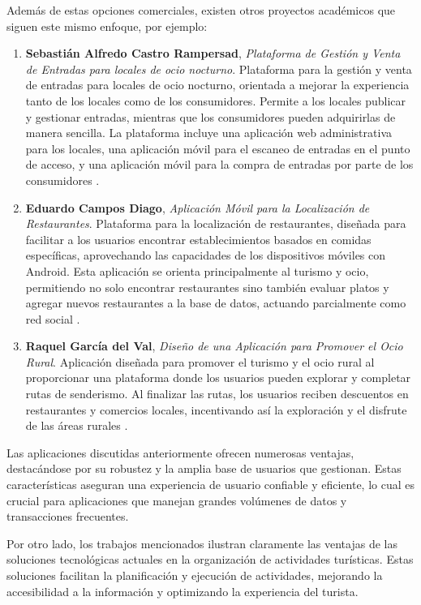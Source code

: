 Además de estas opciones comerciales, existen otros proyectos académicos que siguen este mismo enfoque, por ejemplo:

\begin{enumerate}
    \item \textbf{Sebastián Alfredo Castro Rampersad}, \textit{Plataforma de Gestión y Venta de Entradas
              para locales de ocio nocturno}. Plataforma para la gestión y venta de entradas para locales de ocio nocturno, orientada a mejorar la experiencia tanto de los locales como de los consumidores. Permite a los locales publicar y gestionar entradas, mientras que los consumidores pueden adquirirlas de manera sencilla. La plataforma incluye una aplicación web administrativa para los locales, una aplicación móvil para el escaneo de entradas en el punto de acceso, y una aplicación móvil para la compra de entradas por parte de los consumidores \cite{Sebastian}.
    \item \textbf{Eduardo Campos Diago}, \textit{Aplicación Móvil para la Localización de Restaurantes}. Plataforma para la localización de restaurantes, diseñada para facilitar a los usuarios encontrar establecimientos basados en comidas específicas, aprovechando las capacidades de los dispositivos móviles con Android. Esta aplicación se orienta principalmente al turismo y ocio, permitiendo no solo encontrar restaurantes sino también evaluar platos y agregar nuevos restaurantes a la base de datos, actuando parcialmente como red social \cite{Campos}.
    \item \textbf{Raquel García del Val}, \textit{ Diseño de una Aplicación para Promover el Ocio Rural}. Aplicación diseñada para promover el turismo y el ocio rural al proporcionar una plataforma donde los usuarios pueden explorar y completar rutas de senderismo. Al finalizar las rutas, los usuarios reciben descuentos en restaurantes y comercios locales, incentivando así la exploración y el disfrute de las áreas rurales \cite{Garcia}.
\end{enumerate}

Las aplicaciones discutidas anteriormente ofrecen numerosas ventajas, destacándose por su robustez y la amplia base de usuarios que gestionan. Estas características aseguran una experiencia de usuario confiable y eficiente, lo cual es crucial para aplicaciones que manejan grandes volúmenes de datos y transacciones frecuentes.

Por otro lado, los trabajos mencionados ilustran claramente las ventajas de las soluciones tecnológicas actuales en la organización de actividades turísticas. Estas soluciones facilitan la planificación y ejecución de actividades, mejorando la accesibilidad a la información y optimizando la experiencia del turista.

